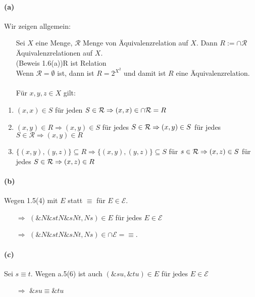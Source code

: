 \documentclass[10pt, a4paper]{article}
\begin{document}
\paragraph*{(a)}Wir zeigen allgemein:
\begin{itemize}
	\item[] Sei $X$ eine Menge, $\mathcal{R}$ Menge von Äquivalenzrelation auf $X$. Dann $R:=\cap\mathcal{R}$ Äquivalenzrelationen auf $X$.	\\
	(Beweis 1.6(a))R ist Relation	\\
	Wenn $\mathcal{R}=\emptyset$ ist, dann ist $R=2^{X^{2}}$ und damit ist $R$ eine Äquivalenzrelation.	\\	\\
	Für $x,y,z\in X$ gilt:
\end{itemize}

\begin{enumerate}
	\item $(x,x)\in S$ für jeden $S\in\mathcal{R}	\\
	\Rightarrow(x,x)\in\cap\mathcal{R}=R$
	\item $(x,y)\in R\Rightarrow(x,y)\in S$ für jedes $S\in\mathcal{R}	\\
	\Rightarrow(x,y)\in S$ für jedes $S\in\mathcal{R}\Rightarrow(x,y)\in R$
	\item $\{(x,y),(y,z)\}\subseteq R\Rightarrow\{(x,y),(y,z)\}\subseteq S$ für $s\in\mathcal{R}	\\
	\Rightarrow(x,z)\in S$ für jedes $S\in \mathcal{R}	\\
	\Rightarrow(x,z)\in R$
\end{enumerate}

\paragraph*{(b)} Wegen 1.5(4) mit $E$ statt $\equiv$ für $E\in\mathcal{E}$.
\begin{itemize}
	\item[$\Rightarrow$] $(\&N\&stN\&sNt, Ns)\in E$ für jedes $E\in\mathcal{E}$
	\item[$\Rightarrow$]$(\&N\&stN\&sNt, Ns)\in\cap\mathcal{E}=\equiv$.
\end{itemize}

\paragraph*{(c)}
Sei $s\equiv t$. Wegen a.5(6) ist auch $(\&su, \&tu)\in E$ für jedes $E\in\mathcal{E}$
\begin{itemize}
	\item[$\Rightarrow$] $\&su\equiv\&tu$
\end{itemize}
\end{document}
